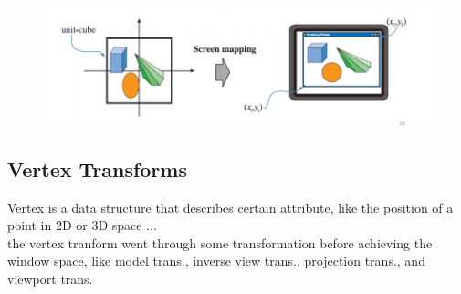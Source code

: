 \documentclass[12pt, a4paper]{article}
\begin{document}
\begin{figure}[!ht]
  \centering
  \includegraphics[width=\textwidth]{image/viewportTransform}
  \label{}
\end{figure}

\subsection{Vertex Transforms}
Vertex is a data structure that describes certain attribute, like the position of a point in 2D or 3D space ... \\
the vertex tranform went through some transformation before achieving the window space, like model trans., inverse view trans., projection trans., and viewport trans.
\end{document}
